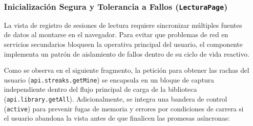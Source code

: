 \documentclass[12pt, atypical, journal]{article}
\begin{document}
\subsubsection{Inicialización Segura y Tolerancia a Fallos (\texttt{LecturaPage})}
La vista de registro de sesiones de lectura requiere sincronizar múltiples fuentes de datos al montarse en el navegador. Para evitar que problemas de red en servicios secundarios bloqueen la operativa principal del usuario, el componente implementa un patrón de aislamiento de fallos dentro de su ciclo de vida reactivo.

Como se observa en el siguiente fragmento, la petición para obtener las rachas del usuario (\texttt{api.streaks.getMine}) se encapsula en un bloque de captura independiente dentro del flujo principal de carga de la biblioteca (\texttt{api.library.getAll}). Adicionalmente, se integra una bandera de control (\texttt{active}) para prevenir fugas de memoria y errores por condiciones de carrera si el usuario abandona la vista antes de que finalicen las promesas asíncronas:
\end{document}
